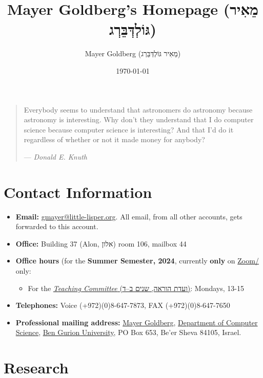 \documentclass[11pt]{article}
\author{Mayer Goldberg (מֵאִיר גּוֹלְדְּבֵּרְג)}
\date{\today}
\title{Mayer Goldberg's Homepage (מֵאִיר גּוֹלְדְּבֵּרְג)}
\begin{document}
\maketitle
\setcounter{tocdepth}{1}
\tableofcontents

\begin{quote}
Everybody seems to understand that astronomers do astronomy because
astronomy is interesting. Why don't they understand that I do computer
science because computer science is interesting? And that I'd do it
regardless of whether or not it made money for anybody? 

--- \emph{Donald E. Knuth}
\end{quote}

\section{Contact Information}
\label{sec:orge446331}

\begin{itemize}
\item \textbf{Email:} \href{mailto:gmayer@little-lisper.org}{gmayer@little-lisper.org}. All email, from all other accounts,
gets forwarded to this account.
\item \textbf{Office:} Building 37 (Alon, אלון) room 106, mailbox 44
\item \textbf{Office hours} (for the \textbf{Summer Semester, 2024}, currently \textbf{only} on \href{https://us02web.zoom.us/j/87582638669?pwd=SVFVOFdvYlQ0enkyZ0s5NEM0ODNYQT09}{Zoom/} only:
\begin{itemize}
\item For the \href{./tc.html}{\emph{Teaching Committee} (ועדת הוראה, שנים ב–ד)}: Mondays, 13-15
\end{itemize}
\item \textbf{Telephones:} Voice (+972)(0)8-647-7873, FAX (+972)(0)8-647-7650
\item \textbf{Professional mailing address:} \href{mailto:gmayer@little-lisper.org}{Mayer Goldberg}, \href{http://www.cs.bgu.ac.il/}{Department of Computer
Science}, \href{http://www.bgu.ac.il/}{Ben Gurion University}, PO Box 653, Be'er Sheva 84105,
Israel.
\end{itemize}

\section{Research}
\label{sec:orgbc2749c}
\end{document}
